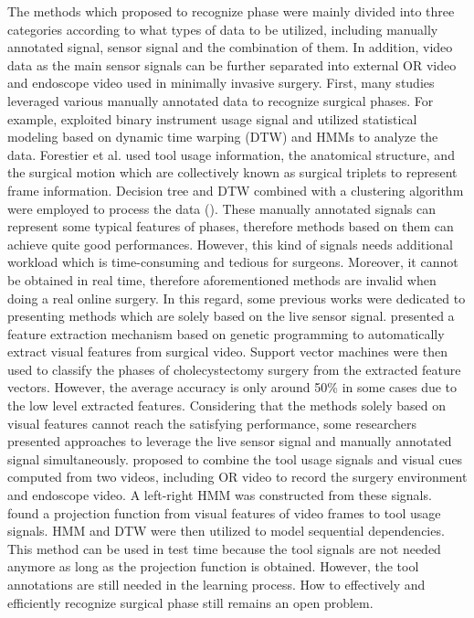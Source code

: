 \documentclass{elsarticle}
\begin{document}
The methods which proposed to recognize phase were mainly divided into three categories according to what types of data to be utilized, including manually annotated signal, sensor signal and the combination of them.
In addition, video data as the main sensor signals can be further separated into external OR video and endoscope video used in minimally invasive surgery. 
First, many studies leveraged various manually annotated data to recognize surgical phases.
For example, \cite{padoy2012statistical} exploited binary instrument usage signal and utilized statistical modeling based on dynamic time warping (DTW) and HMMs to analyze the data.
Forestier et al. used tool usage information, the anatomical structure, and the surgical motion which are collectively known as surgical triplets to represent frame information. Decision tree and DTW combined with a clustering algorithm were employed to process the data (\cite{forestier2013multi,forestier2015automatic}). 
These manually annotated signals can represent some typical features of phases, therefore methods based on them can achieve quite good performances.
However, this kind of signals needs additional workload which is time-consuming and tedious for surgeons.
Moreover, it cannot be obtained in real time, therefore aforementioned methods are invalid when doing a real online surgery.
In this regard, some previous works were dedicated to presenting methods which are solely based on the live sensor signal.
\cite{klank2008automatic} presented a feature extraction mechanism based on genetic programming to automatically extract visual features from surgical video.
Support vector machines were then used to classify the phases of cholecystectomy surgery from the extracted feature vectors. 
However, the average accuracy is only around 50\% in some cases due to the low level extracted features.
Considering that the methods solely based on visual features cannot reach the satisfying performance, some researchers presented approaches to leverage the live sensor signal and manually annotated signal simultaneously.
\cite{padoy2008line} proposed to combine the tool usage signals and visual cues computed from two videos, including OR video to record the surgery environment and endoscope video. A left-right HMM was constructed from these signals.
\cite{blum2010modeling} found a projection function from visual features of video frames to tool usage signals.
HMM and DTW were then utilized to model sequential dependencies.
This method can be used in test time because the tool signals are not needed anymore as long as the projection function is obtained.
However, the tool annotations are still needed in the learning process.
How to effectively and efficiently recognize surgical phase still remains an open problem.
\end{document}
